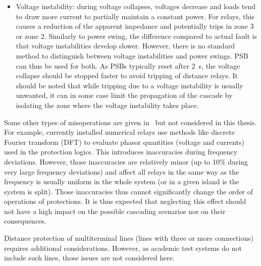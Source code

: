 \begin{itemize}
    \item Voltage instability: during voltage collapses, voltages decrease and loads tend to draw more current to partially maintain a constant power. For relays, this causes a reduction of the apparent impedance and potentially trips in zone 3 or zone 2. Similarly to power swing, the difference compared to actual fault is that voltage instabilities develop slower. However, there is no standard method to distinguish between voltage instabilities and power swings. PSB can thus be used for both. As PSBs typically reset after 2~s, the voltage collapse should be stopped faster to avoid tripping of distance relays. It should be noted that while tripping due to a voltage instability is usually unwanted, it can in some case limit the propagation of the cascade by isolating the zone where the voltage instability takes place.
\end{itemize}

Some other types of misoperations are given in~\cite{PSRCreportProtectionMisop} but not considered in this thesis. For example, currently installed numerical relays use methods like discrete Fourier transform (DFT) to evaluate phasor quantities (voltage and currents) used in the protection logics. This introduces inaccuracies during frequency deviations. However, those inaccuracies are relatively minor (up to 10\% during very large frequency deviations) and affect all relays in the same way as the frequency is usually uniform in the whole system (or in a given island is the system is split). Those inaccuracies thus cannot significantly change the order of operations of protections. It is thus expected that neglecting this effect should not have a high impact on the possible cascading scenarios nor on their consequences.

Distance protection of multiterminal lines (lines with three or more connections) requires additional considerations. However, as academic test systems do not include such lines, those issues are not considered here.


